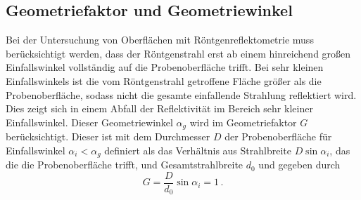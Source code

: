 \subsection*{Geometriefaktor und Geometriewinkel}
Bei der Untersuchung von Oberflächen mit Röntgenreflektometrie muss berücksichtigt werden, dass der 
Röntgenstrahl erst ab einem hinreichend großen Einfallswinkel vollständig auf die Probenoberfläche trifft.
Bei sehr kleinen Einfallswinkels ist die vom Röntgenstrahl getroffene Fläche größer als die Probenoberfläche,
sodass nicht die gesamte einfallende Strahlung reflektiert wird. Dies zeigt sich in einem Abfall der 
Reflektivität im Bereich sehr kleiner Einfallswinkel.
Dieser Geometriewinkel $\alpha_g$ wird im Geometriefaktor $G$ berücksichtigt. Dieser ist mit dem Durchmesser 
$D$ der Probenoberfläche für Einfallswinkel $\alpha_i < \alpha_g$ definiert als 
das Verhältnis aus Strahlbreite $D \sin \alpha_i$, das die die Probenoberfläche trifft, und 
Gesamtstrahlbreite $d_0$ und gegeben durch
\begin{equation}
    G = \frac{D}{d_0} \sin \alpha_i = 1 \, .
    \label{eq:geometrie}
\end{equation}
